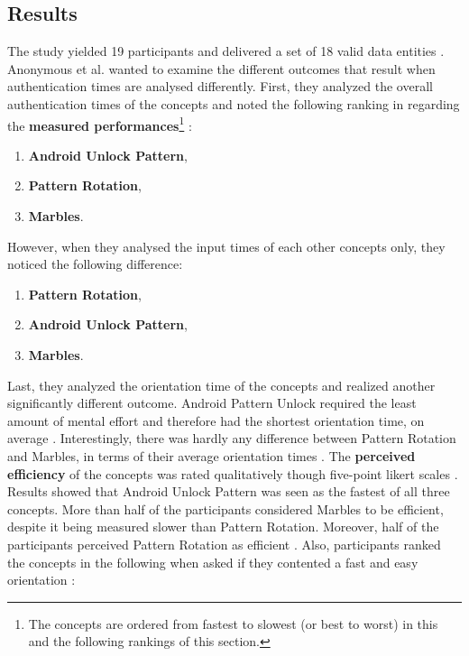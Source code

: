 \subsection{Results}

The study yielded 19 participants and delivered a set of 18 valid data entities \cite{anonymous}. Anonymous et al. \cite{anonymous} wanted to examine the different outcomes that result when authentication times are analysed differently. First, they analyzed the overall authentication times of the concepts and noted the following ranking in regarding the \textbf{measured performances}\footnote{The concepts are ordered from fastest to slowest (or best to worst) in this and the following rankings of this section.} \cite{anonymous}:

\begin{enumerate}
    \item \textbf{Android Unlock Pattern},
    \item \textbf{Pattern Rotation},
    \item \textbf{Marbles}.
\end{enumerate} 

However, when they analysed the input times of each other concepts only, they noticed the following difference:

\begin{enumerate}
    \item \textbf{Pattern Rotation},
    \item \textbf{Android Unlock Pattern},
    \item \textbf{Marbles}.
\end{enumerate}

Last, they analyzed the orientation time of the concepts and realized another significantly different outcome. Android Pattern Unlock required the least amount of mental effort and therefore had the shortest orientation time, on average \cite{anonymous}. Interestingly, there was hardly any difference between Pattern Rotation and Marbles, in terms of their average orientation times \cite{anonymous}. The \textbf{perceived efficiency} of the concepts was rated qualitatively though five-point likert scales \cite{anonymous}. Results showed that Android Unlock Pattern was seen as the fastest of all three concepts. More than half of the participants considered Marbles to be efficient, despite it being measured slower than Pattern Rotation. Moreover, half of the participants perceived Pattern Rotation as efficient \cite{anonymous}. Also, participants ranked the concepts in the following when asked if they contented a fast and easy orientation \cite{anonymous}: 

